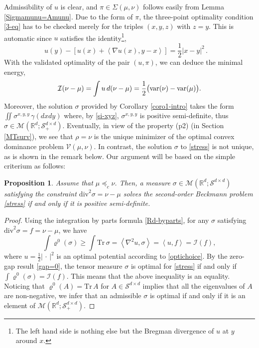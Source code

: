 \documentclass[11pt,letterpaper,reqno]{amsart}
\newtheorem{proposition}[theorem]{Proposition}
\theoremstyle{definition}
\numberwithin{equation}{section}
\newcommand{\R}{\mathbb{R}}
\newcommand{\Rd}{\R^d}
\newcommand{\var}{{\rm{var}}}
\newcommand{\argu}{{\,\cdot\,}}
\newcommand{\Mes}{{\mathcal{M}}}
\newcommand{\Sddp}{{\mathcal{S}^{d\times d}_+}}
\newcommand{\dive}{{\mathrm{div}}}
\newcommand{\tr}{{\mathrm{Tr}}}
\newcommand{\pairing}[1]{{\left \langle #1 \right \rangle}}
\newcommand{\abs}[1]{{\left \lvert #1 \right \rvert}}
\newcommand{\I}{\mathcal{I}}
\newcommand{\V}{{\mathcal{V}}}
\newcommand{\Sdd}{{\mathcal{S}^{d \times d}}}
\begin{document}
{Admissibility of $u$ is clear, and $\pi \in \Sigma(\mu,\nu)$ follows easily from Lemma \ref{Sigmamunu=Amunu}. Due to the form of $\pi$, the three-point optimality condition \eqref{3-eq} has to be checked merely for the triples $(x,y,z)$ with $z=y$.
  This is automatic since  $u$ satisfies the identity\footnote{
The left  hand side is nothing else but the Bregman divergence of $u$ at $y$ around $x$.},
 $$  u(y) - [ u(x) + \pairing{\nabla u(x), y-x}]  = \frac1{2} |x-y|^2 \, .\quad $$ 
 With the validated optimality of the pair $(u,\pi)$,  we can deduce the minimal energy,
 $$\mathcal{I}(\nu-\mu) = \int u\, d(\nu-\mu) = \frac{1}{2}\big(\var(\nu) - \var(\mu)\big).$$
Moreover, the solution $\sigma$ provided by Corollary \ref{coro1-intro} takes the form \linebreak $\iint \sigma^{x,y,y} \,\gamma(dxdy)$
where, by \eqref{si-xyz}, $\sigma^{x,y,y}$  is positive semi-definite, thus   $\sigma \in \Mes(\Rd;\Sddp)$. 
 Eventually, in view of the property (p2) (in Section \ref{MTsurv}), we see that $\rho=\nu$ is the unique  minimizer of the optimal convex dominance problem $\V(\mu,\nu)$. 
 In contrast, the solution $\sigma$ to \eqref{stress} is not unique, as is shown in the remark below. 
 Our argument will be based on  the simple criterium as follows:
 \begin{proposition}\label{positive}
	Assume that $\mu \preceq_c \nu$. Then, a measure $\sigma \in \Mes(\Rd;\Sdd)$ satisfying the constraint $	 \dive^2 \sigma = \nu - \mu$ solves the second-order Beckmann problem \eqref{stress} if and only if it is positive semi-definite.
\end{proposition}
\begin{proof}
	Using the integration by parts formula \eqref{Rd-byparts}, for any $\sigma$ satisfying $\dive^2 \sigma = f  = \nu - \mu$, we have
	\begin{equation*}
		\int \varrho^0(\sigma) \geq  \int \tr\,\sigma  = \pairing{\nabla^2 u,\sigma} = \pairing{u,f} = \mathcal{I}(f),
	\end{equation*}
	where $u = \frac{1}{2} \abs{\argu}^2$ is an optimal potential according to \eqref{optichoice}.
	By the zero-gap result \eqref{gap=0},  the tensor measure $\sigma$ is optimal for \eqref{stress} if and only if 
	$\int \varrho^0(\sigma) =\I(f)$. This means that  the above inequality is an equality. Noticing that $\varrho^0(A) = \tr\,A$ for $A\in\Sdd$ implies that all the eigenvalues  of $A$ are non-negative,
	we infer that an admissible $\sigma$ is optimal if and only if it is an element of $ \Mes(\R^d;\Sddp)$. 
	\end{proof}

}
\end{document}
